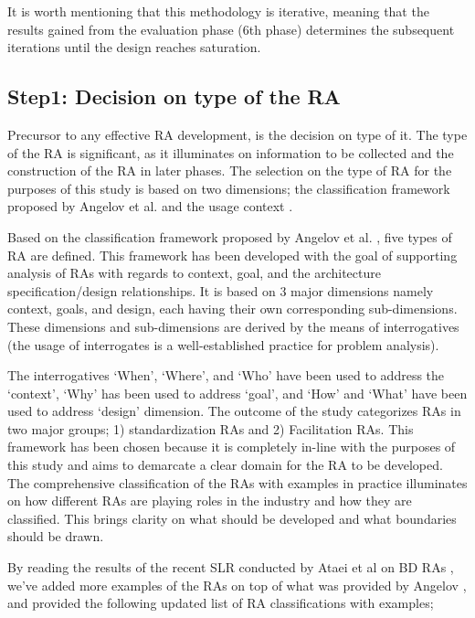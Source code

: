 \documentclass[review]{elsarticle}
\begin{document}
It is worth mentioning that this methodology is iterative, meaning that the results gained from the evaluation phase (6th phase) determines the subsequent iterations until the design reaches saturation.

\subsection{Step1: Decision on type of the RA}

Precursor to any effective RA development, is the decision on type of it. The type of the RA is significant, as it illuminates on information to be collected and the construction of the RA in later phases. The selection on the type of RA for the purposes of this study is based on two dimensions; the classification framework proposed by Angelov et al. \cite{angelov2009classification} and the usage context \cite{angelov2008contracting}.

Based on the classification framework proposed by Angelov et al. \cite{angelov2009classification}, five types of RA are defined. This framework has been developed with the goal of supporting analysis of RAs with regards to context, goal, and the architecture specification/design relationships. It is based on 3 major dimensions namely context, goals, and design, each having their own corresponding sub-dimensions. These dimensions and sub-dimensions are derived by the means of interrogatives (the usage of interrogates is a well-established practice for problem analysis).

The interrogatives ‘When’, ‘Where’, and ‘Who’ have been used to address the ‘context’, ‘Why’ has been used to address ‘goal’, and ‘How’ and ‘What’ have been used to address ‘design’ dimension. The outcome of the study categorizes RAs in two major groups; 1) standardization RAs and 2) Facilitation RAs. This framework has been chosen because it is completely in-line with the purposes of this study and aims to demarcate a clear domain for the RA to be developed. The comprehensive classification of the RAs with examples in practice illuminates on how different RAs are playing roles in the industry and how they are classified. This brings clarity on what should be developed and what boundaries should be drawn.

By reading the results of the recent SLR conducted by Ataei et al on BD RAs \cite{AtaeiACIS}, we've added more examples of the RAs on top of what was provided by Angelov \cite{angelov2009classification}, and provided the following updated list of RA classifications with examples;
\end{document}

